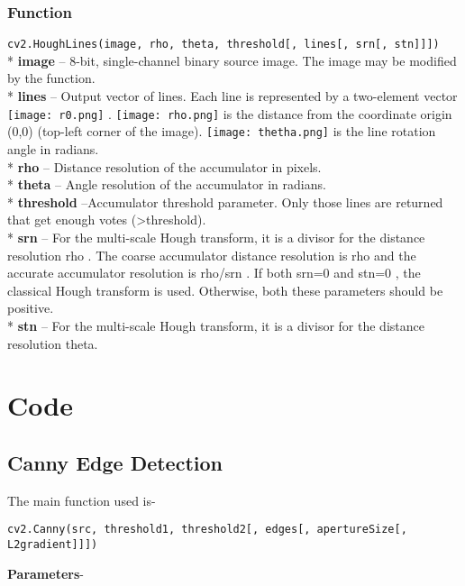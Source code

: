 \documentclass[]{article}
\begin{document}
\subsubsection{Function}\label{function}

\texttt{cv2.HoughLines(image,\ rho,\ theta,\ threshold{[},\ lines{[},\ srn{[},\ stn{]}{]}{]})}\\
* \textbf{image} -- 8-bit, single-channel binary source image. The image
may be modified by the function.\\
* \textbf{lines} -- Output vector of lines. Each line is represented by
a two-element vector
\texttt{[image: r0.png]} .
\texttt{[image: rho.png]} is the
distance from the coordinate origin (0,0) (top-left corner of the
image). \texttt{[image: thetha.png]}
is the line rotation angle in radians. \\
* \textbf{rho} -- Distance resolution of the accumulator in pixels.\\
 * \textbf{theta} -- Angle resolution of the accumulator in radians.\\
 * \textbf{threshold} --Accumulator threshold parameter. Only those lines are returned that get
enough votes (\textgreater{}threshold). \\
* \textbf{srn} -- For the multi-scale Hough transform, it is a divisor for the distance resolution
rho . The coarse accumulator distance resolution is rho and the accurate
accumulator resolution is rho/srn . If both srn=0 and stn=0 , the
classical Hough transform is used. Otherwise, both these parameters
should be positive. \\
* \textbf{stn} -- For the multi-scale Hough transform, it is a divisor for the distance resolution theta.

\section{Code}\label{code}

\subsection{Canny Edge Detection}\label{canny-edge-detection}

The main function used is-

\begin{verbatim}
cv2.Canny(src, threshold1, threshold2[, edges[, apertureSize[, L2gradient]]])
\end{verbatim}

\textbf{Parameters}-
\end{document}
